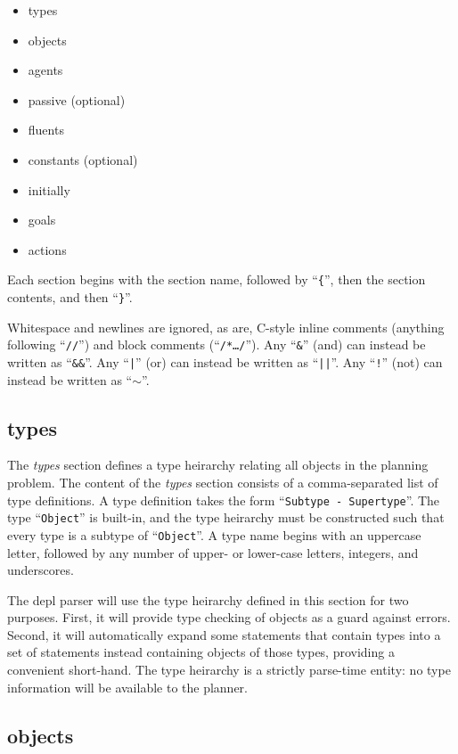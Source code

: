 \documentclass{article}
\begin{document}
\begin{itemize}
\item types
\item objects
\item agents
\item passive (optional)
\item fluents
\item constants (optional)
\item initially
\item goals
\item actions
\end{itemize}

\noindent
Each section begins with the section name, followed by
``\verb|{|'', 
then the section contents, and then
``\verb|}|''. 

Whitespace and newlines are ignored,
as are, C-style inline comments (anything
following ``\texttt{//}'') and block comments (``\texttt{/*\ldots*/}'').
Any
``\texttt{\&}''
(and) can instead be written as
``\texttt{\&\&}''.
Any
``\texttt{|}''
(or) can instead be written as
``\texttt{||}''.
Any
``\texttt{!}''
(not) can instead be written as
``$\sim$''.


\subsection{types}

The \emph{types} section defines a type heirarchy relating all objects in the planning
problem.
The content of the \emph{types} section consists of a comma-separated list of
type definitions. A type definition takes the form
``\texttt{Subtype - Supertype}''.
The type ``\texttt{Object}'' is built-in, and
the type heirarchy must be constructed such that every type is a subtype of
``\texttt{Object}''.  A type name begins with an uppercase letter, followed
by any number of upper- or lower-case letters, integers, and underscores.

The depl parser will use the type heirarchy defined in this section for two 
purposes. First, it will provide type checking of objects as a guard against errors.
Second, it will automatically expand some
statements that contain types into a set of statements instead containing
objects of those types, providing a convenient short-hand. 
The type heirarchy is a strictly parse-time entity: no type information will be
available to the planner.


\subsection{objects}
\end{document}
